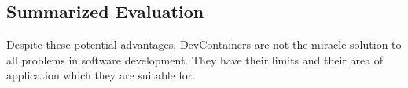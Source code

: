     \subsection{Summarized Evaluation}
    Despite these potential advantages, DevContainers are not the miracle solution to all problems in software development. They have their limits and their area of application which they are suitable for.



